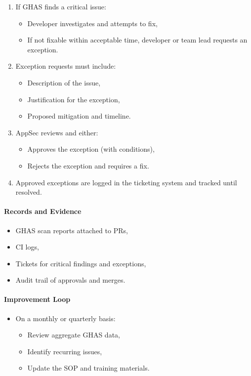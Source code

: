 \documentclass[11pt]{article}
\begin{document}
\begin{enumerate}
  \item If GHAS finds a critical issue:
        \begin{itemize}
          \item Developer investigates and attempts to fix,
          \item If not fixable within acceptable time,
                developer or team lead requests an exception.
        \end{itemize}
  \item Exception requests must include:
        \begin{itemize}
          \item Description of the issue,
          \item Justification for the exception,
          \item Proposed mitigation and timeline.
        \end{itemize}
  \item AppSec reviews and either:
        \begin{itemize}
          \item Approves the exception (with conditions),
          \item Rejects the exception and requires a fix.
        \end{itemize}
  \item Approved exceptions are logged in the ticketing system
        and tracked until resolved.
\end{enumerate}

\paragraph{Records and Evidence}

\begin{itemize}
  \item GHAS scan reports attached to PRs,
  \item CI logs,
  \item Tickets for critical findings and exceptions,
  \item Audit trail of approvals and merges.
\end{itemize}

\paragraph{Improvement Loop}

\begin{itemize}
  \item On a monthly or quarterly basis:
        \begin{itemize}
          \item Review aggregate GHAS data,
          \item Identify recurring issues,
          \item Update the SOP and training materials.
        \end{itemize}
\end{itemize}
\end{document}

